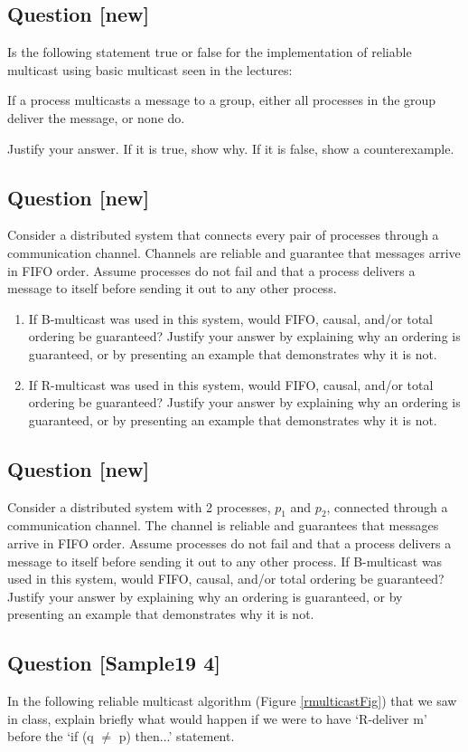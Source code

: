 \documentclass[11pt]{article}
\newcounter{question}
\newcommand{\question}[1]{
    \stepcounter{question}
    \subsection*{Question \thequestion \hfill
      {\normalsize [{#1}]}} }
\begin{document}
\question{new}
Is the following statement true or false for the implementation of reliable multicast using basic multicast seen in the lectures:

If a process multicasts a message to a group, either all processes in the group deliver the message, or none do.

Justify your answer. If it is true, show why. If it is false, show a counterexample. 

\question{new}
Consider a distributed system that connects every pair of processes through a communication channel. Channels are reliable and guarantee that messages arrive in FIFO order. Assume processes do not fail and that a process delivers a message to itself before sending it out to any other process. 

\begin{enumerate}
	\item If B-multicast was used in this system, would FIFO, causal, and/or total ordering be guaranteed? Justify your answer by explaining why an ordering is guaranteed, or by presenting an example that demonstrates why it is not.
	\item If R-multicast was used in this system, would FIFO, causal, and/or total ordering be guaranteed? Justify your answer by explaining why an ordering is guaranteed, or by presenting an example that demonstrates why it is not.
\end{enumerate}

\question{new}
Consider a distributed system with 2 processes, $p_1$ and $p_2$, connected through a communication channel. The channel is reliable and guarantees that messages arrive in FIFO order. Assume processes do not fail and that a process delivers a message to itself before sending it out to any other process. If B-multicast was used in this system, would FIFO, causal, and/or total ordering be guaranteed? Justify your answer by explaining why an ordering is guaranteed, or by presenting an example that demonstrates why it is not.

\question{Sample19 4}

In  the  following  reliable  multicast  algorithm (Figure \ref{rmulticastFig}) that  we  saw  in  class,  explain  briefly  what  would happen if we were to have `R-deliver m' before the `if (q $\neq$ p) then...' statement.
\end{document}
